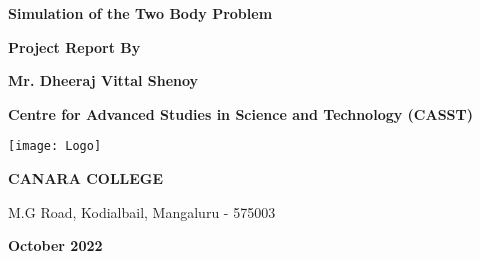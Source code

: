 \begin{titlepage}

    \drawBorder

    \begin{center}
        
        \vspace{1cm}

        \Huge
        \textbf{Simulation of the Two Body Problem}
        
        \vspace{5cm}
        \Large
        \textbf{Project Report By}
        
        \vspace{0.4cm}
        \huge
        \textbf{Mr. Dheeraj Vittal Shenoy}

        \vspace{4cm}

        \LARGE
        \textbf{Centre for Advanced Studies in Science and Technology (CASST)}
        \vspace{1cm}

        \begin{center}
            \texttt{[image: Logo]}
        \end{center}

        \Huge
        \textbf{CANARA COLLEGE}

        \LARGE
        M.G Road, Kodialbail, Mangaluru - 575003

        \vfill
        \Large
        \textbf{October 2022}

    \end{center}


\setcounter{secnumdepth}{0}

\end{titlepage}
